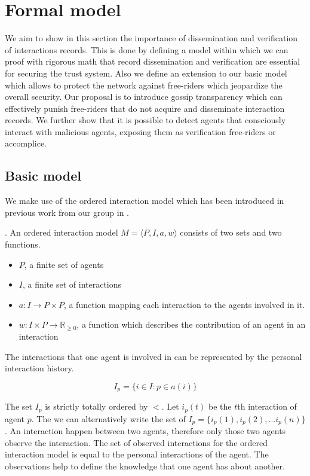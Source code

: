 \chapter{Formal model}
We aim to show in this section the importance of dissemination and verification of interactions 
records. This is done by defining a model within which we can proof with rigorous math that record
dissemination and verification are essential for securing the trust system. Also we define an 
extension to our basic model which allows to protect the network against free-riders which 
jeopardize the overall security. Our proposal is to introduce gossip transparency which can 
effectively punish free-riders that do not acquire and disseminate interaction records. We further 
show that it is possible to detect agents that consciously interact with malicious agents, exposing
them as verification free-riders or accomplice.

\section{Basic model}
We make use of the ordered interaction model which has been introduced in previous work from 
our group in \cite{OTTE2017}. 

\begin{defn}. An ordered interaction model $M = \langle P, I, a, w \rangle$
    consists of two sets and two functions.
    \begin{itemize}
        \item $P$, a finite set of agents
        \item $I$, a finite set of interactions
        \item $a : I \rightarrow P \times P$, a function mapping each interaction to the agents involved in it.
        \item $w : I \times P \rightarrow \mathbb{R}_{\geq0}$, a function which describes the contribution of an agent in an interaction
    \end{itemize}
\end{defn}

The interactions that one agent is involved in can be represented by the personal interaction history.

\[ I_p = \{ i \in I : p \in a(i) \}\]

The set $I_p$ is strictly totally ordered by $<$. Let $i_p(t)$ be the $t$th interaction of agent 
$p$. The we can alternatively write the set of $I_p = \{ i_p(1), i_p(2), ... i_p(n) \}$.
An interaction happen between two agents, therefore only those two agents observe the interaction.
The set of observed interactions for the ordered interaction model is equal to the personal 
interactions of the agent. The observations help to define the knowledge that one agent has about
another. 

